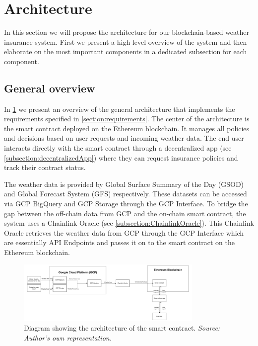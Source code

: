 \section{Architecture}

In this section we will propose the architecture for our blockchain-based weather insurance system. First we present a high-level overview of the system and then elaborate on the most important components in a dedicated subsection for each component.

\subsection{General overview}

In \ref{fig:generalArchitecture} we present an overview of the general architecture that implements the requirements specified in \ref{section:requirements}. The center of the architecture is the smart contract deployed on the Ethereum blockchain. It manages all policies and decisions based on user requests and incoming weather data. The end user interacts directly with the smart contract through a decentralized app (see \ref{subsection:decentralizedApp}) where they can request insurance policies and track their contract status. 

The weather data is provided by Global Surface Summary of the Day (GSOD) and Global Forecast System (GFS) respectively. These datasets can be accessed via GCP BigQuery and GCP Storage through the GCP Interface. To bridge the gap between the off-chain data from GCP and the on-chain smart contract, the system uses a Chainlink Oracle (see \ref{subsection:ChainlinkOracle}). This Chainlink Oracle retrieves the weather data from GCP through the GCP Interface which are essentially API Endpoints and passes it on to the smart contract on the Ethereum blockchain.

\begin{figure}[h]
    \centering
    \includegraphics[width=0.8\textwidth]{figures/architecture-overview.drawio.pdf}
    \caption{Diagram showing the architecture of the smart contract. \textit{Source: Author's own representation.}}
    \label{fig:generalArchitecture}
\end{figure}

